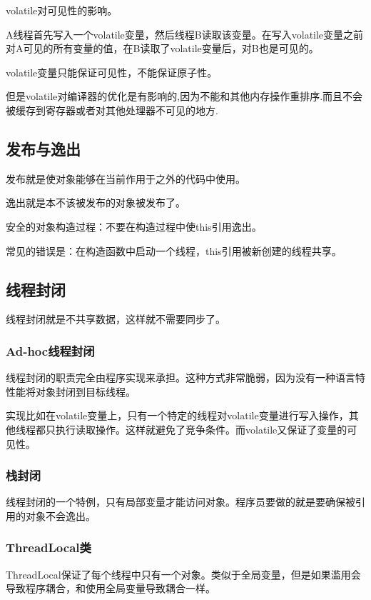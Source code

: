 volatile对可见性的影响。

A线程首先写入一个volatile变量，然后线程B读取该变量。在写入volatile变量之前对A可见的所有变量的值，在B读取了volatile变量后，对B也是可见的。


volatile变量只能保证可见性，不能保证原子性。

但是volatile对编译器的优化是有影响的,因为不能和其他内存操作重排序.而且不会被缓存到寄存器或者对其他处理器不可见的地方.



\subsection{发布与逸出}

发布就是使对象能够在当前作用于之外的代码中使用。

逸出就是本不该被发布的对象被发布了。

安全的对象构造过程：不要在构造过程中使this引用逸出。

常见的错误是：在构造函数中启动一个线程，this引用被新创建的线程共享。

\subsection{线程封闭}

线程封闭就是不共享数据，这样就不需要同步了。

\subsubsection{Ad-hoc线程封闭}

线程封闭的职责完全由程序实现来承担。这种方式非常脆弱，因为没有一种语言特性能将对象封闭到目标线程。

实现比如在volatile变量上，只有一个特定的线程对volatile变量进行写入操作，其他线程都只执行读取操作。这样就避免了竞争条件。而volatile又保证了变量的可见性。

\subsubsection{栈封闭}

线程封闭的一个特例，只有局部变量才能访问对象。程序员要做的就是要确保被引用的对象不会逸出。

\subsubsection{ThreadLocal类}

ThreadLocal保证了每个线程中只有一个对象。类似于全局变量，但是如果滥用会导致程序耦合，和使用全局变量导致耦合一样。






